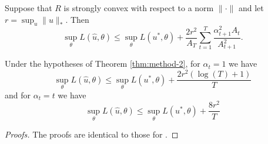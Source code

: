 \documentclass{article} %
\begin{document}
\begin{theorem}
\label{thm:method-2}
Suppose that $R$ is strongly convex with respect to a norm $\|\cdot\|$ 
and let $r = \sup_{u} \|u\|_{*}$. Then 
\[ \sup_{\theta} L(\hat{u}, \theta) \leq \sup_{\theta} L(u^*, \theta) + \frac{2r^2}{A_T} \sum_{t=1}^T \frac{\alpha_{t+1}^2A_t}{A_{t+1}^2}. \]
\end{theorem}
\begin{corollary}
\label{cor:method-2}
Under the hypotheses of Theorem \ref{thm:method-2}, for $\alpha_t = 1$ we have
\[ \sup_{\theta} L(\hat{u}, \theta) \leq \sup_{\theta} L(u^*, \theta) + \frac{2r^2(\log(T) + 1)}{T} \]
and for $\alpha_t = t$ we have
\[ \sup_{\theta} L(\hat{u}, \theta) \leq \sup_{\theta} L(u^*, \theta) + \frac{8r^2}{T} \]
\end{corollary}
\begin{proof}[Proofs]
The proofs are identical to those for \primal.
\end{proof}
\end{document}
